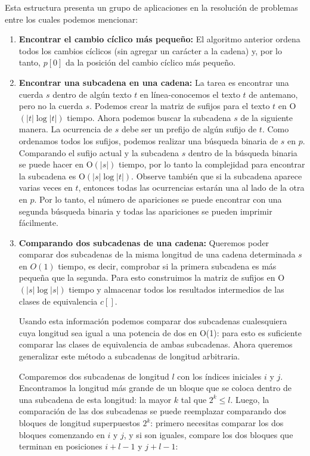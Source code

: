Esta estructura presenta un grupo de aplicaciones en la resolución de problemas entre los cuales podemos mencionar:

\begin{enumerate}
	\item \textbf{Encontrar el cambio cíclico más pequeño:} El algoritmo anterior ordena todos los cambios cíclicos (sin agregar un carácter a la cadena) y, por lo tanto, $p[0]$ da la posición del cambio cíclico más pequeño.
	
	\item \textbf{Encontrar una subcadena en una cadena:} La tarea es encontrar una cuerda $s$ dentro de algún texto $t$ en línea-conocemos el texto $t$ de
	antemano, pero no la cuerda $s$. Podemos crear la matriz de sufijos para el texto $t$ en O$(|t|\log|t|)$ tiempo. Ahora podemos buscar la subcadena $s$
	de la siguiente manera. La ocurrencia de $s$ debe ser un prefijo de algún sufijo de $t$. Como ordenamos todos los sufijos, podemos realizar una búsqueda 
	binaria de $s$ en $p$. Comparando el sufijo actual y la subcadena $s$ dentro de la búsqueda binaria se puede hacer en O$(|s|)$ tiempo, por lo tanto la
	complejidad para encontrar la subcadena es O$(|s|\log|t|)$. Observe también que si la subcadena aparece varias veces en $t$, entonces todas las 
	ocurrencias estarán una al lado de la otra en $p$. Por lo tanto, el número de apariciones se puede encontrar con una segunda búsqueda binaria y todas las 
	apariciones se pueden imprimir fácilmente.
	
	\item \textbf{Comparando dos subcadenas de una cadena:} Queremos poder comparar dos subcadenas de la misma longitud de una cadena determinada $s$ en $O(1)$ 
	tiempo, es decir, comprobar si la primera subcadena es más pequeña que la segunda. Para esto construimos la matriz de sufijos en O$(|s|\log|s|)$ tiempo y
	almacenar todos los resultados intermedios de las clases de equivalencia $c[]$.
	
	Usando esta información podemos comparar dos subcadenas cualesquiera cuya longitud sea igual a una potencia de dos en O(1): para esto es suficiente comparar las clases de equivalencia de ambas subcadenas. Ahora queremos generalizar este método a subcadenas de longitud arbitraria.
	
	Comparemos dos subcadenas de longitud $l$ con los índices iniciales $i$ y $j$. Encontramos la longitud más grande de un bloque que se coloca dentro de una 
	subcadena de esta longitud: la mayor $k$ tal que $2^k\le l$. Luego, la comparación de las dos subcadenas se puede reemplazar comparando dos bloques de longitud superpuestos $2^k$: primero necesitas comparar los dos bloques comenzando en $i$ y $j$, y si son iguales, compare los dos bloques que terminan en
	posiciones $i+l-1$ y $j+l-1$:
		

\end{enumerate}
